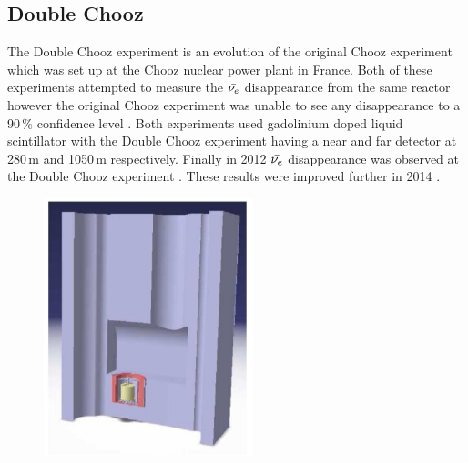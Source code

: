 \subsection{Double Chooz}
The Double Chooz experiment is an evolution of the original Chooz experiment which was set up at the Chooz nuclear power plant in France\cite{lasserre2006}. Both of these experiments attempted to measure the $\Bar{\nu_e}$ disappearance from the same reactor however the original Chooz experiment was unable to see any disappearance to a 90$\,\%$ confidence level \cite{Apollonio_2003}. Both experiments used gadolinium doped liquid scintillator with the Double Chooz experiment having a near and far detector at 280\,m and 1050\,m respectively\cite{lasserre2006}. Finally in 2012 $\Bar{\nu_e}$ disappearance was observed at the Double Chooz experiment \cite{Abe_2012}. These results were improved further in 2014 \cite{abe2014improved}.
\begin{figure}[htbp]
 \centering
 \includegraphics[height=75mm]{Chapter2/Figs/Raster/DCNearDetector.png} %
 \label{DoubleChoozNearDetector}
\end{figure}
